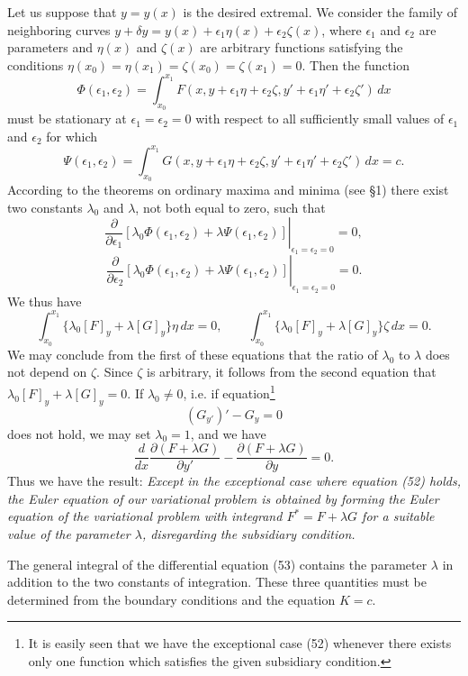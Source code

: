 Let us suppose that $y=y(x)$ is the desired extremal. We consider the family of neighboring curves $y+\delta y=y(x)+\epsilon_1\eta(x)+\epsilon_2\zeta(x)$, where $\epsilon_1$ and $\epsilon_2$ are parameters and $\eta(x)$ and $\zeta(x)$ are arbitrary functions satisfying the conditions $\eta(x_0)=\eta(x_1)=\zeta(x_0)=\zeta(x_1)=0$. Then the function
\[
\Phi(\epsilon_1,\epsilon_2)=\int_{x_0}^{x_1}
F(x,y+\epsilon_1\eta+\epsilon_2\zeta,y'+\epsilon_1\eta'+\epsilon_2\zeta')\,dx
\]
must be stationary at $\epsilon_1=\epsilon_2=0$ with respect to all sufficiently small values of $\epsilon_1$ and $\epsilon_2$ for which
\[
\Psi(\epsilon_1,\epsilon_2)=\int_{x_0}^{x_1}
G(x,y+\epsilon_1\eta+\epsilon_2\zeta,y'+\epsilon_1\eta'+\epsilon_2\zeta')\,dx=c.
\]
According to the theorems on ordinary maxima and minima (see \S1) there exist two constants $\lambda_0$ and $\lambda$, not both equal to zero, such that
\[
\left.\frac{\partial}{\partial\epsilon_1}[\lambda_0\Phi(\epsilon_1,\epsilon_2)+\lambda\Psi(\epsilon_1,\epsilon_2)]\right|_{\epsilon_1=\epsilon_2=0}=0,
\]
\[
\left.\frac{\partial}{\partial\epsilon_2}[\lambda_0\Phi(\epsilon_1,\epsilon_2)+\lambda\Psi(\epsilon_1,\epsilon_2)]\right|_{\epsilon_1=\epsilon_2=0}=0.
\]
We thus have
\[
\int_{x_0}^{x_1}\{\lambda_0[F]_y+\lambda[G]_y\}\eta\,dx=0,
\qquad
\int_{x_0}^{x_1}\{\lambda_0[F]_y+\lambda[G]_y\}\zeta\,dx=0.
\]
We may conclude from the first of these equations that the ratio of $\lambda_0$ to $\lambda$ does not depend on $\zeta$. Since $\zeta$ is arbitrary, it follows from the second equation that $\lambda_0[F]_y+\lambda[G]_y=0$. If $\lambda_0\ne0$, i.e. if equation\footnote{It is easily seen that we have the exceptional case (52) whenever there exists only one function which satisfies the given subsidiary condition.}
\begin{equation}\tag{52}
(G_{y'})'-G_y=0
\end{equation}
does not hold, we may set $\lambda_0=1$, and we have
\begin{equation}\tag{53}
\frac{d}{dx}\frac{\partial(F+\lambda G)}{\partial y'}-
\frac{\partial(F+\lambda G)}{\partial y}=0.
\end{equation}
Thus we have the result: \emph{Except in the exceptional case where equation (52) holds, the Euler equation of our variational problem is obtained by forming the Euler equation of the variational problem with integrand $F^*=F+\lambda G$ for a suitable value of the parameter $\lambda$, disregarding the subsidiary condition.}

The general integral of the differential equation (53) contains the parameter $\lambda$ in addition to the two constants of integration. These three quantities must be determined from the boundary conditions and the equation $K=c$.

